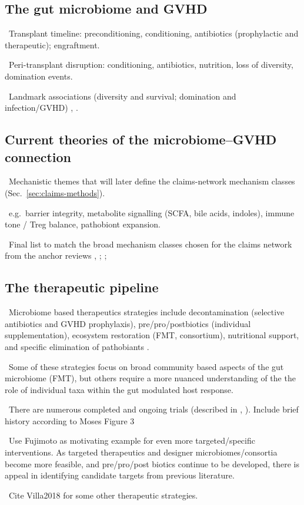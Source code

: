 \documentclass[11pt,a4paper]{article}
\newcommand{\todoitem}[1]{\par\noindent\textcolor{blue!70!black}{\textbullet~#1}}
\begin{document}
\subsection*{The gut microbiome and GVHD}
\todoitem{Transplant timeline: preconditioning, conditioning, antibiotics (prophylactic and therapeutic); engraftment.}
\todoitem{Peri-transplant disruption: conditioning, antibiotics, nutrition, loss of diversity, domination events.}
\todoitem{Landmark associations (diversity and survival; domination and infection/GVHD) \cite{jenq2012regulation-65d} \cite{taur2015role-b42}, \cite{blautiajenq2015}.}

\subsection*{Current theories of the microbiome--GVHD connection}
\todoitem{Mechanistic themes that will later define the claims-network mechanism classes (Sec.~\ref{sec:claims-methods}).}
\todoitem{e.g.\ barrier integrity, metabolite signalling (SCFA, bile acids, indoles), immune tone / Treg balance, pathobiont expansion.}
\todoitem{Final list to match the broad mechanism classes chosen for the claims network from the anchor reviews \cite{paredes2026intestinal-400}, \cite{samarkhazan2025microbiome-4bd}; \cite{weber2026microbiome-023}; \cite{moses2026gut-cdb}}


\subsection*{The therapeutic pipeline}
\todoitem{Microbiome based therapeutics strategies include decontamination (selective antibiotics and GVHD prophylaxis), pre/pro/postbiotics (individual supplementation), ecosystem restoration (FMT, consortium), nutritional support, and specific elimination of pathobiants \cite{moses2026gut-cdb} \cite{paredes2026intestinal-400} \cite{Fujimoto2024}.}
\todoitem{Some of these strategies focus on broad community based aspects of the gut microbiome (FMT), but others require a more nuanced understanding of the the role of individual taxa within the gut modulated host response. }
\todoitem{There are numerous completed and ongoing trials (described in \cite{paredes2026intestinal-400}, \cite{moses2026gut-cdb}). Include brief history according to Moses Figure 3}
\todoitem{Use Fujimoto \cite{Fujimoto2024} as motivating example for even more targeted/specific interventions. As targeted therapeutics and designer microbiomes/consortia become more feasible, and pre/pro/post biotics continue to be developed, there is appeal in identifying candidate targets from previous literature.}
\todoitem{Cite Villa2018 \cite{villa2018virotherapy-7ed} for some other therapeutic strategies. }
\end{document}
